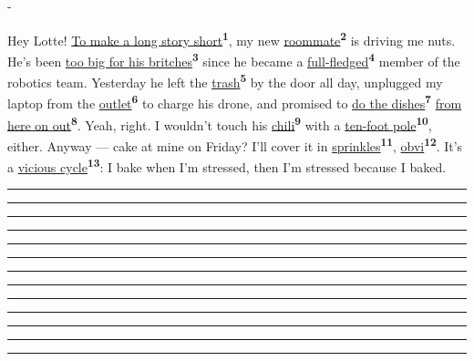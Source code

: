 \documentclass[11pt,a4paper]{article}
\makeatletter
\newcommand{\needsp}[1]{\par\begingroup\setlength{\dimen@}{#1}\dimen@ii\pagegoal\advance\dimen@ii-\pagetotal
  \ifdim\dimen@>\dimen@ii\ifdim\dimen@ii>\z@\vfil\penalty-\@M\fi\fi\endgroup}
\newcommand{\hfont}{\fontfamily{pag}\selectfont}
\newcommand{\uifont}{\sffamily}
\newcommand{\num}[1]{\leavevmode{\uifont\bfseries\small\color{accent}#1}}
\newcommand{\blank}[1][1.25cm]{\textcolor{mute}{\rule[-0.45ex]{#1}{0.5pt}}}
\makeatother
\begin{document}
\par\vspace{2mm}\needsp{75mm}
\noindent{\hfont\bfseries\small\color{accent}B}\par\vspace{1.5mm}
\newcommand{\us}[2]{\underline{#2}\textsuperscript{\uifont\bfseries\tiny\color{accent}#1}}
\begin{tcolorbox}[enhanced,colback=accentsoft,colframe=accentsoft,boxrule=0pt,arc=3mm,left=4mm,right=4mm,top=2mm,bottom=2mm,fontupper=\small,
  sharp corners=southwest]
Hey Lotte! \us{1}{To make a long story short}, my new \us{2}{roommate} is driving me nuts. He’s been \us{3}{too big for his britches} since he became a \us{4}{full-fledged} member of the robotics team. Yesterday he left the \us{5}{trash} by the door all day, unplugged my laptop from the \us{6}{outlet} to charge his drone, and promised to \us{7}{do the dishes} \us{8}{from here on out}. Yeah, right. I wouldn’t touch his \us{9}{chili} with a \us{10}{ten-foot pole}, either. Anyway — cake at mine on Friday? I’ll cover it in \us{11}{sprinkles}, \us{12}{obvi}. It’s a \us{13}{vicious cycle}: I bake when I’m stressed, then I’m stressed because I baked.
\end{tcolorbox}
\vspace{1mm}
{\small\begin{multicols}{3}
\num{1} \blank[3.4cm]\par\vspace{1.7mm}\num{2} \blank[3.4cm]\par\vspace{1.7mm}\num{3} \blank[3.4cm]\par\vspace{1.7mm}\num{4} \blank[3.4cm]\par\vspace{1.7mm}\num{5} \blank[3.4cm]\par\vspace{1.7mm}
\num{6} \blank[3.4cm]\par\vspace{1.7mm}\num{7} \blank[3.4cm]\par\vspace{1.7mm}\num{8} \blank[3.4cm]\par\vspace{1.7mm}\num{9} \blank[3.4cm]\par\vspace{1.7mm}
\num{10} \blank[3.4cm]\par\vspace{1.7mm}\num{11} \blank[3.4cm]\par\vspace{1.7mm}\num{12} \blank[3.4cm]\par\vspace{1.7mm}\num{13} \blank[3.4cm]\par
\end{multicols}}
\end{document}
